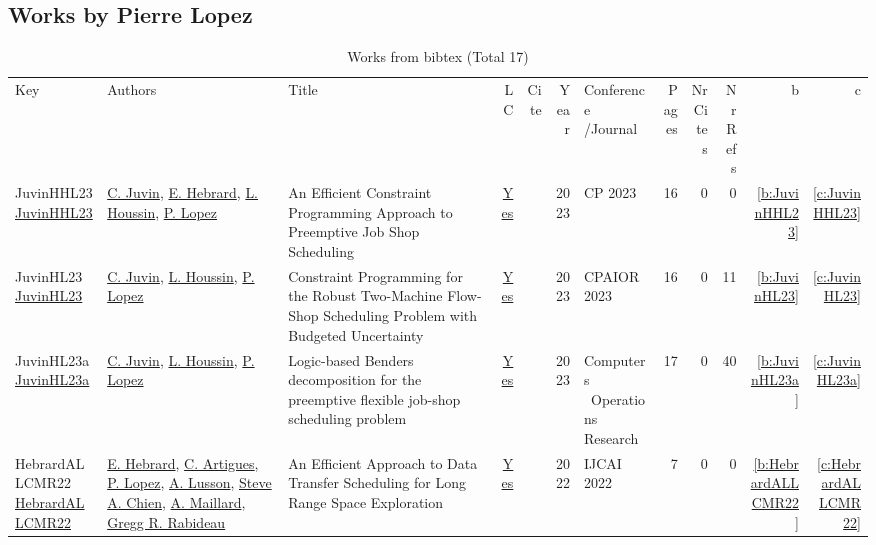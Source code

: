 \subsection{Works by Pierre Lopez}
\label{sec:a3}
{\scriptsize
\begin{longtable}{>{\raggedright\arraybackslash}p{3cm}>{\raggedright\arraybackslash}p{6cm}>{\raggedright\arraybackslash}p{6.5cm}rrrp{2.5cm}rrrrr}
\rowcolor{white}\caption{Works from bibtex (Total 17)}\\ \toprule
\rowcolor{white}Key & Authors & Title & LC & Cite & Year & \shortstack{Conference\\/Journal} & Pages & \shortstack{Nr\\Cites} & \shortstack{Nr\\Refs} & b & c \\ \midrule\endhead
\bottomrule
\endfoot
JuvinHHL23 \href{https://doi.org/10.4230/LIPIcs.CP.2023.19}{JuvinHHL23} & \hyperref[auth:a0]{C. Juvin}, \hyperref[auth:a1]{E. Hebrard}, \hyperref[auth:a2]{L. Houssin}, \hyperref[auth:a3]{P. Lopez} & An Efficient Constraint Programming Approach to Preemptive Job Shop Scheduling & \href{works/JuvinHHL23.pdf}{Yes} & \cite{JuvinHHL23} & 2023 & CP 2023 & 16 & 0 & 0 & \ref{b:JuvinHHL23} & \ref{c:JuvinHHL23}\\
JuvinHL23 \href{https://doi.org/10.1007/978-3-031-33271-5\_23}{JuvinHL23} & \hyperref[auth:a0]{C. Juvin}, \hyperref[auth:a2]{L. Houssin}, \hyperref[auth:a3]{P. Lopez} & Constraint Programming for the Robust Two-Machine Flow-Shop Scheduling Problem with Budgeted Uncertainty & \href{works/JuvinHL23.pdf}{Yes} & \cite{JuvinHL23} & 2023 & CPAIOR 2023 & 16 & 0 & 11 & \ref{b:JuvinHL23} & \ref{c:JuvinHL23}\\
JuvinHL23a \href{http://dx.doi.org/10.1016/j.cor.2023.106156}{JuvinHL23a} & \hyperref[auth:a0]{C. Juvin}, \hyperref[auth:a2]{L. Houssin}, \hyperref[auth:a3]{P. Lopez} & Logic-based Benders decomposition for the preemptive flexible job-shop scheduling problem & \href{works/JuvinHL23a.pdf}{Yes} & \cite{JuvinHL23a} & 2023 & Computers \  Operations Research & 17 & 0 & 40 & \ref{b:JuvinHL23a} & \ref{c:JuvinHL23a}\\
HebrardALLCMR22 \href{https://doi.org/10.24963/ijcai.2022/643}{HebrardALLCMR22} & \hyperref[auth:a1]{E. Hebrard}, \hyperref[auth:a6]{C. Artigues}, \hyperref[auth:a3]{P. Lopez}, \hyperref[auth:a797]{A. Lusson}, \hyperref[auth:a798]{Steve A. Chien}, \hyperref[auth:a799]{A. Maillard}, \hyperref[auth:a800]{Gregg R. Rabideau} & An Efficient Approach to Data Transfer Scheduling for Long Range Space Exploration & \href{works/HebrardALLCMR22.pdf}{Yes} & \cite{HebrardALLCMR22} & 2022 & IJCAI 2022 & 7 & 0 & 0 & \ref{b:HebrardALLCMR22} & \ref{c:HebrardALLCMR22}\\

\end{longtable}}

